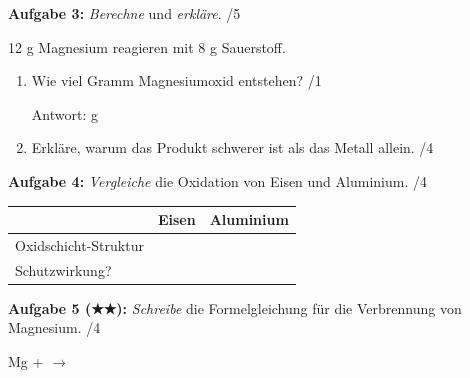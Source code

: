 \documentclass[11pt, a4paper]{article}
\newcommand{\punkte}[1]{\hfill\textcolor{mittelgrau}{/#1}}
\newcommand{\luecke}[1]{\underline{\hspace{#1}}}
\begin{document}
\vspace{1em}


\textbf{Aufgabe 3:} \textit{Berechne} und \textit{erkläre}. \punkte{5}

12 g Magnesium reagieren mit 8 g Sauerstoff.

\begin{enumerate}[label=\alph*), leftmargin=2em, itemsep=0.3em]
    \item Wie viel Gramm Magnesiumoxid entstehen? \punkte{1}

    \vspace{0.3em}
    Antwort: \luecke{2cm} g

    \item Erkläre, warum das Produkt schwerer ist als das Metall allein. \punkte{4}

    \vspace{2.5cm}
\end{enumerate}


\textbf{Aufgabe 4:} \textit{Vergleiche} die Oxidation von Eisen und Aluminium. \punkte{4}

\begin{tabular}{|p{3cm}|p{5.5cm}|p{5.5cm}|}
\hline
& \textbf{Eisen} & \textbf{Aluminium} \\
\hline
Oxidschicht-Struktur & & \\[1.2em]
\hline
Schutzwirkung? & & \\[1.2em]
\hline
\end{tabular}

\vspace{1em}


\textbf{Aufgabe 5 (★★):} \textit{Schreibe} die Formelgleichung für die Verbrennung von Magnesium. \punkte{4}

\vspace{0.3em}
\hspace{2em} \luecke{1.5cm} Mg + \luecke{1.5cm} $\longrightarrow$ \luecke{1.5cm} \luecke{2cm}
\end{document}
